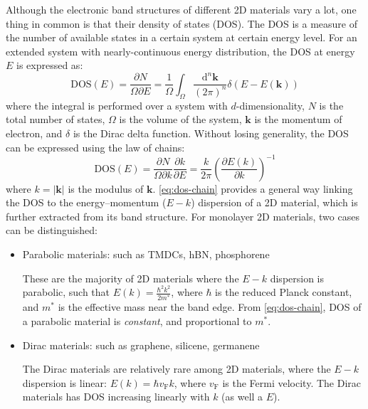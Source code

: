 Although the electronic band structures of different 2D materials vary
a lot, one thing in common is that their density of states (DOS). The
DOS is a measure of the number of available states in a certain system
at certain energy level. For an extended system with nearly-continuous
energy distribution, the DOS at energy $E$ is expressed as:
\begin{equation}
  \label{eq:ch-intro-dos}
  \mathrm{DOS}(E) = \frac{\partial N}{\Omega \partial E} =  \frac{1}{\Omega} {\displaystyle \int_{\Omega}} \frac{\mathrm{d}^{n} \mathbf{k}}{(2 \pi)^{n}}
  \delta(E - E(\mathbf{k}))
\end{equation}
where the integral is performed over a system with $d$-dimensionality,
$N$ is the total number of states,
$\Omega$ is the volume of the system, $\mathbf{k}$ is the momentum of
electron, and $\delta$ is the Dirac delta function. Without losing
generality, the DOS can be expressed using the law of chains:
\begin{equation}
  \label{eq:dos-chain}
  \mathrm{DOS}(E) = \frac{\partial N}{\Omega \partial k} \frac{\partial k}{\partial E}
               = \frac{k}{2 \pi} \left(\frac{\partial E(k)}{\partial k}\right)^{-1}
\end{equation}
where $k=|\mathbf{k}|$ is the modulus of $\mathbf{k}$.
%
\autoref{eq:dos-chain} provides a general way linking the DOS to the
energy--momentum ($E-k$) dispersion of a 2D material, which is further
extracted from its band structure. For monolayer 2D materials, two
cases can be distinguished:
\begin{itemize}
\item Parabolic materials: such as TMDCs, hBN, phosphorene

  These are the majority of 2D materials where the $E-k$ dispersion is
  parabolic, such that
  ${\displaystyle E(k) = \frac{\hbar^{2} k^{2}}{2 m^{*}}}$, where
  $\hbar$ is the reduced Planck constant, and $m^{*}$ is the effective
  mass near the band edge. From \autoref{eq:dos-chain}, DOS of a
  parabolic material is \textit{constant}, and proportional
  to $m^{*}$.
  
\item Dirac materials: such as graphene, silicene, germanene

  The Dirac materials are relatively rare among 2D materials,
   where the $E-k$ dispersion is linear:
  $E(k) = \hbar v_{\mathrm{F}}k$, where $v_{\mathrm{F}}$ is the Fermi
  velocity. The Dirac materials has DOS increasing linearly with $k$
  (as well a $E$).
\end{itemize}

